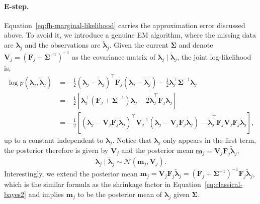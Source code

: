 \paragraph*{E-step.}
\label{para:fhem-estep}
Equation~\eqref{eq:fh-marginal-likelihood} carries the approximation error discussed above. To avoid it, we introduce a genuine EM algorithm, where the missing data are $\bm{\lambda}_j$ and the observations are $\tilde{\bm{\lambda}}_j$. Given the current $\bm{\Sigma}$ and denote $\mathbf{V}_j = \left(\mathbf{F}_j + \bm{\Sigma}^{-1}\right)^{-1}$ as the covariance matrix of $\bm{\lambda}_{j}\mid \tilde{\bm{\lambda}}_{j}$, the joint log-likelihood is,
\begin{align}
    \log p\left(\bm{\lambda}_{j},\tilde{\bm{\lambda}}_{j}\right)&=-\frac{1}{2}\left(\bm{\lambda}_{j}-\tilde{\bm{\lambda}}_{j}\right)^{\top}\mathbf{F}_{j}\left(\bm{\lambda}_{j}-\tilde{\bm{\lambda}}_{j}\right)-\frac{1}{2}\bm{\lambda}_{j}^{\top}\bm{\Sigma}^{-1}\bm{\lambda}_{j}\\
    &=-\frac{1}{2}\left[\bm{\lambda}_{j}^{\top}\left(\mathbf{F}_{j}+\bm{\Sigma}^{-1}\right)\bm{\lambda}_{j}-2\tilde{\bm{\lambda}}_{j}^{\top}\mathbf{F}_{j}\bm{\lambda}_{j}\right]\\
    &=-\frac{1}{2}\left[\left(\bm{\lambda}_{j} - \mathbf{V}_{j} \mathbf{F}_{j} \tilde{\bm{\lambda}}_{j}\right)^{\top} \mathbf{V}_{j}^{-1} \left(\bm{\lambda}_{j} - \mathbf{V}_{j} \mathbf{F}_{j} \tilde{\bm{\lambda}}_{j}\right) - \tilde{\bm{\lambda}}_{j}^{\top} \mathbf{F}_{j} \mathbf{V}_{j} \mathbf{F}_{j} \tilde{\bm{\lambda}}_{j}\right],
    \label{eq:joint-log-density}
\end{align}
up to a constant independent to $\bm{\lambda}_{j}$. Notice that $\bm{\lambda}_{j}$ only appears in the first term, the posterior therefore is given by $\mathbf{V}_{j}$ and the posterior mean $\mathbf{m}_{j} = \mathbf{V}_{j} \mathbf{F}_{j} \tilde{\bm{\lambda}}_{j}$,
\begin{equation}
    \bm{\lambda}_{j}\mid \tilde{\bm{\lambda}}_{j}\sim \mathcal{N}\left(\mathbf{m}_{j},\mathbf{V}_{j}\right).
    \label{eq:fh-posterior}
\end{equation}
Interestingly, we extend the posterior mean $\mathbf{m}_{j} = \mathbf{V}_{j} \mathbf{F}_{j} \tilde{\bm{\lambda}}_{j}=\left(\mathbf{F}_{j}+\bm{\Sigma}^{-1}\right)^{-1}\mathbf{F}_{j}\tilde{\bm{\lambda}}_{j}$, which is  the similar formula as the shrinkage factor in Equation~\eqref{eq:classical-bayes2} and implies $\mathbf{m}_{j}$ to be the posterior mean of $\bm{\lambda}_{j}$ given $\bm{\Sigma}$.  

